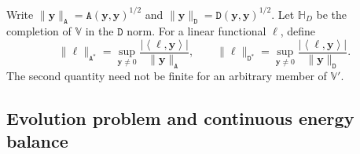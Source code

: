 \documentclass[11pt,a4paper]{article}
\newcommand{\bs}{\boldsymbol}
\DeclareMathOperator{\ddiv}{div}
\newcommand{\Div}{\ddiv}
\newcommand{\V}{\mathbb V}
\newcommand{\DD}{\mathtt D}
\newcommand{\Aform}{\mathtt A}
\newcommand{\ff}{\mathtt f}
\newcommand{\dual}[2]{\left\langle#1,#2\right\rangle}
\theoremstyle{definition}
\numberwithin{equation}{section}
\begin{document}








Write $\|\bs y\|_{\Aform}=\Aform(\bs y,\bs y)^{1/2}$ and $\|\bs y\|_{\DD}=\DD(\bs y,\bs y)^{1/2}$. Let $\mathbb H_D$ be the completion of $\V$ in the $\DD$ norm. For a linear functional $\ell$, define
\begin{equation}\label{eq:dualnorms}
 \|\ell\|_{\Aform^*}=\sup_{\bs y\ne0}\frac{|\dual{\ell}{\bs y}|}{\|\bs y\|_{\Aform}},
 \qquad
 \|\ell\|_{\DD^*}=\sup_{\bs y\ne0}\frac{|\dual{\ell}{\bs y}|}{\|\bs y\|_{\DD}}.
\end{equation}
The second quantity need not be finite for an arbitrary member of $\V'$.

\subsection{Evolution problem and continuous energy balance}
\end{document}
